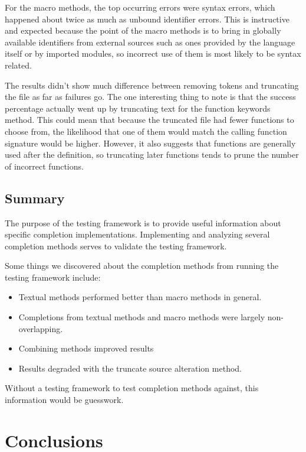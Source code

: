 \documentclass[ms,electronic,twosidetoc,letterpaper,chaptercenter,parttop,lol,lof,lot]{byumsphd}
\begin{document}
For the macro methods, the top occurring errors were syntax errors, which happened about twice as much as unbound identifier errors.
This is instructive and expected because the point of the macro methods is to bring in globally available identifiers from external sources such as ones provided by the language itself or by imported modules, so incorrect use of them is most likely to be syntax related.

The results didn't show much difference between removing tokens and truncating the file as far as failures go.
The one interesting thing to note is that the success percentage actually went up by truncating text for the function keywords method.
This could mean that because the truncated file had fewer functions to choose from, the likelihood that one of them would match the calling function signature would be higher.
However, it also suggests that functions are generally used after the definition, so truncating later functions tends to prune the number of incorrect functions.

\section{Summary}

The purpose of the testing framework is to provide useful information about specific completion implementations.
Implementing and analyzing several completion methods serves to validate the testing framework.

Some things we discovered about the completion methods from running the testing framework include:

\begin{itemize}

\item Textual methods performed better than macro methods in general.
\item Completions from textual methods and macro methods were largely non-overlapping.
\item Combining methods improved results
\item Results degraded with the truncate source alteration method.

\end{itemize}

Without a testing framework to test completion methods against, this information would be guesswork.

\chapter{Conclusions}
\end{document}
